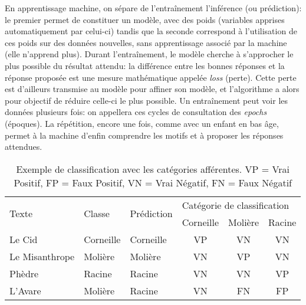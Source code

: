 En apprentissage machine, on sépare de l'entraînement l'inférence (ou prédiction): le premier permet de constituer un modèle, avec des poids (variables apprises automatiquement par celui-ci) tandis que la seconde correspond à l'utilisation de ces poids sur des données nouvelles, sans apprentissage associé par la machine (elle n'apprend plus). Durant l'entraînement, le modèle cherche à s'approcher le plus possible du résultat attendu: la différence entre les bonnes réponses et la réponse proposée est une mesure mathématique appelée \textit{loss} (perte). Cette perte est d'ailleurs transmise au modèle pour affiner son modèle, et l'algorithme a alors pour objectif de réduire celle-ci le plus possible. Un entraînement peut voir les données plusieurs fois: on appellera ces cycles de consultation des \textit{epochs} (époques). La répétition, encore une fois, comme avec un enfant en bas âge, permet à la machine d'enfin comprendre les motifs et à proposer les réponses attendues. 

\begin{table}[]
\centering
\begin{tabular}{lllccc}
\toprule
\multirow{2}{*}{Texte} & \multirow{2}{*}{Classe} & \multirow{2}{*}{Prédiction} & \multicolumn{3}{l}{Catégorie de classification} \\
                       &                         &                             & Corneille        & Molière       & Racine       \\ \midrule
Le Cid                 & Corneille               & Corneille                   & VP               & VN            & VN           \\
Le Misanthrope         & Molière                 & Molière                     & VN               & VP            & VN           \\
Phèdre                 & Racine                  & Racine                      & VN               & VN            & VP           \\
L'Avare                & Molière                 & Racine                      & VN               & FN            & FP          \\ \bottomrule
\end{tabular}
\caption{Exemple de classification avec les catégories afférentes. VP = Vrai Positif, FP = Faux Positif, VN = Vrai Négatif, FN = Faux Négatif}
\label{deep-learning:table:true-positives}
\end{table}

